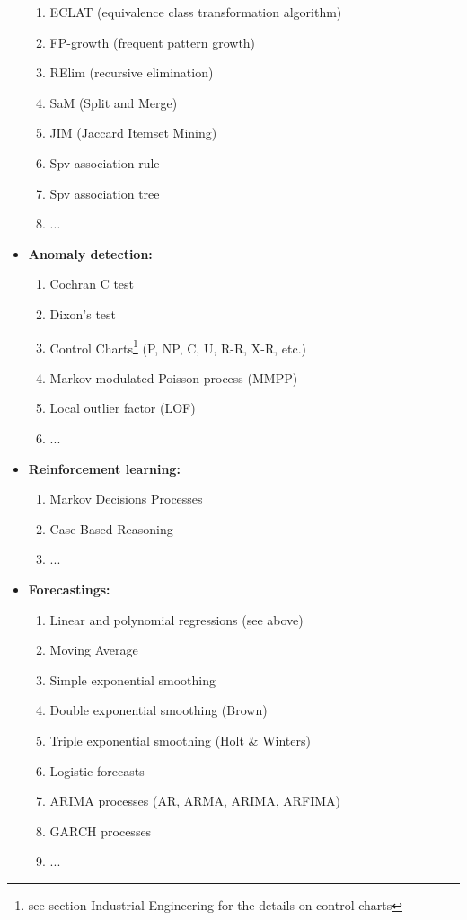 \begin{itemize}
\begin{enumerate}
			\item ECLAT (equivalence class transformation algorithm)
			\item FP-growth (frequent pattern growth)
			\item RElim (recursive elimination)
			\item SaM (Split and Merge)
			\item JIM (Jaccard Itemset Mining)
			\item Spv association rule 
			\item Spv association tree
			\item ...
		\end{enumerate}
		\item \textbf{Anomaly detection:}
		\begin{enumerate}
			\item Cochran C test
			\item Dixon's test
			\item Control Charts\footnote{see section Industrial Engineering for the details on control charts} (P, NP, C, U, R-R, X-R, etc.)
			\item Markov modulated Poisson process
(MMPP)
			\item Local outlier factor (LOF)
			\item ...
		\end{enumerate}
		\item \textbf{Reinforcement learning:}
		\begin{enumerate}
			\item Markov Decisions Processes
			\item Case-Based Reasoning 
			\item ...
		\end{enumerate}
		\item \textbf{Forecastings:}
		\begin{enumerate}
			\item Linear and polynomial regressions (see above)
			\item Moving Average
			\item Simple exponential smoothing
			\item Double exponential smoothing (Brown)
			\item Triple exponential smoothing (Holt \& Winters)
			\item Logistic forecasts
			\item ARIMA processes (AR, ARMA, ARIMA, ARFIMA)
			\item GARCH processes
			\item ...

\end{enumerate}
\end{itemize}
